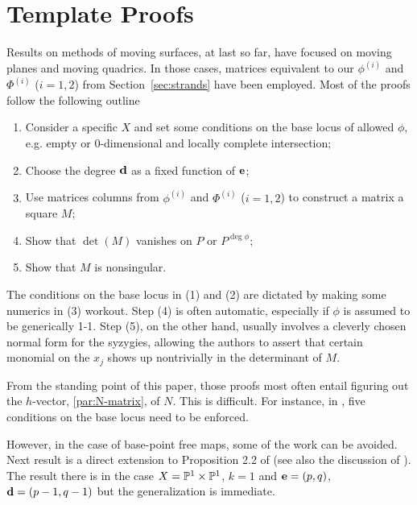 \documentclass[fleqn,reqno]{amsart}
\begin{document}


\section{Template Proofs}

\begin{paragraf}
\label{par:template-proof}
Results on methods of moving surfaces, at last so far, have focused on
moving planes and moving quadrics.
In those cases, matrices equivalent to our $\phi^{(i)}$ and $\Phi^{(i)}$ ($i=1,2$)
from Section~\ref{sec:strands} have been employed.
Most of the proofs follow the following outline
\begin{enumerate}
\item
Consider a specific $X$ and set some conditions on the base locus of allowed $\phi$,
e.g. empty or 0-dimensional and locally complete intersection;
\item
Choose the degree $\mathbf d$ as a fixed function of $\mathbf e$;
\item
Use matrices columns from $\phi^{(i)}$ and $\Phi^{(i)}$ ($i=1,2$) to construct a matrix a
square $M$;
\item
Show that $\det(M)$ vanishes on $P$ or $P^{\deg\phi}$;
\item
Show that $M$ is nonsingular.
\end{enumerate}

The conditions on the base locus in (1) and (2) are dictated by
making some numerics in (3) workout.
Step (4) is often automatic, especially if $\phi$ is assumed to be generically 1-1.
Step (5), on the other hand, usually involves a cleverly chosen normal form for the syzygies,
allowing the authors to assert that certain monomial on the $x_j$ shows up nontrivially
in the determinant of $M$.
\end{paragraf}

\begin{paragraf}
From the standing point of this paper, those proofs most often entail
figuring out the $h$-vector, \eqref{par:N-matrix}, of $N$.
This is difficult.
For instance, in \citet{BCD-03},
five conditions on the base locus need to be enforced.
\end{paragraf}

\begin{paragraf*}
However, in the case of base-point free maps, some of the work can be avoided.
Next result is a direct extension to Proposition 2.2 of \citet{CGZ-00}
(see also the discussion of \citet{Cox-01}).
The result there is in the case $X=\mathbb{P}^1\times\mathbb{P}^1$, $k=1$ and $\mathbf e=(p,q)$, $\mathbf d=(p-1,q-1)$
but the generalization is immediate.
\end{paragraf*}
\end{document}

